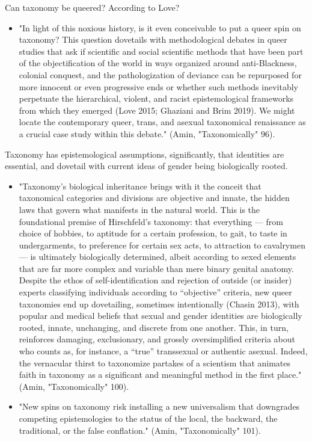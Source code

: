 \documentclass[11pt]{article}
\begin{document}
\begin{enumerate}
Can taxonomy be queered? According to Love?
\begin{itemize}
\item "In light of this noxious history, is it even conceivable to put a
queer spin on taxonomy? This question dovetails with methodological
debates in queer studies that ask if scientific and social
scientific methods that have been part of the objectification of the
world in ways organized around anti-Blackness, colonial conquest,
and the pathologization of deviance can be repurposed for more
innocent or even progressive ends or whether such methods inevitably
perpetuate the hierarchical, violent, and racist epistemological
frameworks from which they emerged (Love 2015; Ghaziani and Brim
2019). We might locate the contemporary queer, trans, and asexual
taxonomical renaissance as a crucial case study within this debate."
(Amin, "Taxonomically" 96).
\end{itemize}

Taxonomy has epistemological assumptions, significantly, that
identities are essential, and dovetail with current ideas of gender
being biologically rooted. 
\begin{itemize}
\item "Taxonomy’s biological inheritance brings with it the conceit that
taxonomical categories and divisions are objective and innate, the
hidden laws that govern what manifests in the natural world. This is
the foundational premise of Hirschfeld’s taxonomy: that everything —
from choice of hobbies, to aptitude for a certain profession, to
gait, to taste in undergarments, to preference for certain sex acts,
to attraction to cavalrymen — is ultimately biologically determined,
albeit according to sexed elements that are far more complex and
variable than mere binary genital anatomy. Despite the ethos of
self-identification and rejection of outside (or insider) experts
classifying individuals according to “objective” criteria, new queer
taxonomies end up dovetailing, sometimes intentionally (Chasin
2013), with popular and medical beliefs that sexual and gender
identities are biologically rooted, innate, unchanging, and discrete
from one another. This, in turn, reinforces damaging, exclusionary,
and grossly oversimplified criteria about who counts as, for
instance, a “true” transsexual or authentic asexual. Indeed, the
vernacular thirst to taxonomize partakes of a scientism that
animates faith in taxonomy as a significant and meaningful method in
the first place." (Amin, "Taxonomically" 100).
\item "New spins on taxonomy risk installing a new universalism that
downgrades competing epistemologies to the status of the local, the
backward, the traditional, or the false conflation." (Amin,
"Taxonomically" 101).
\end{itemize}



\end{enumerate}
\end{document}
